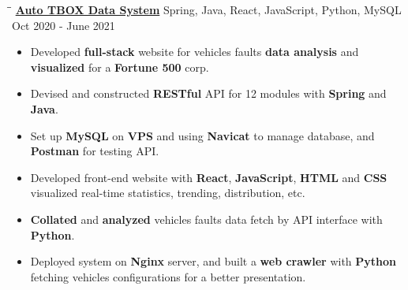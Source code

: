 \documentclass{res}
\begin{document}
\begin{resume}
    \vspace{-0.05in}	 
    \begin{tabbing}
    \hspace{2.3in}\= \hspace{3.45in}\= \kill %
    \href{https://github.com/DolorHunter/AutoTBOXDataSystem}{\bf Auto TBOX Data System}  \> 
                Spring, Java, React, JavaScript, Python, MySQL \> 
				Oct 2020 - June 2021
				\\
    \end{tabbing}\vspace{-20pt}      %
    \vspace{+0.1in}
    \begin{itemize} \itemsep 1.5pt %
        \item Developed {\bf full-stack} website for vehicles faults {\bf data analysis} and
        {\bf visualized} for a {\bf Fortune 500} corp.
        \item Devised and constructed {\bf RESTful} API for 12 modules with 
                {\bf Spring} and {\bf Java}.
        \item Set up {\bf MySQL} on {\bf VPS} and using {\bf Navicat} to manage database, and 
                {\bf Postman} for testing API.
        \item Developed front-end website with {\bf React}, {\bf JavaScript}, {\bf HTML} and {\bf CSS} visualized real-time statistics,  
                trending, distribution, etc.
        \item {\bf Collated} and {\bf analyzed} vehicles faults data fetch by API interface with 
                {\bf Python}.
        \item Deployed system on {\bf Nginx} server, and built a {\bf web crawler} with {\bf Python} fetching vehicles configurations for 
                a better presentation.
    \end{itemize}

\end{resume}
\end{document}
